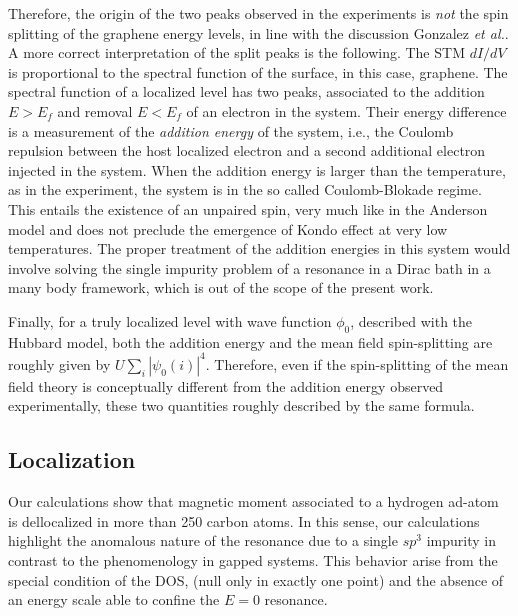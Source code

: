 \documentclass[aps,prb,twocolumn,superscriptaddress]{revtex4-1}
\begin{document}
Therefore, the origin of the two peaks observed in the experiments
\cite{gonzalez2016atomic} is {\em not} the spin splitting of the graphene energy levels, in line with the discussion Gonzalez {\em et al.}\cite{gonzalez2016atomic}.  A more correct interpretation of the split peaks is the following. The STM $dI/dV$ is proportional to the spectral function of the surface, in this case,  graphene. The spectral function of a localized level has two peaks,  associated to the addition $E>E_f$ and removal $E<E_f$ of an electron in the system. Their energy difference is a measurement of the {\em addition energy} of the system, i.e., the Coulomb repulsion between the host localized electron and a second additional electron injected in the system. When the addition energy is larger than the temperature, as in the experiment, the system is in the so called Coulomb-Blokade regime. This entails the existence of an unpaired spin, very much like in the Anderson model\cite{anderson1961localized} and does not preclude the emergence of Kondo effect at very low temperatures. The proper treatment of the addition energies in this system would involve solving the single impurity problem of a resonance in a Dirac bath in a many body  framework\cite{haase2011magnetic,sofo2012magnetic,mitchell13}, which is out of the scope of the present work.

Finally, for a truly localized level with wave function $\phi_0$, described with the Hubbard model,  both the addition energy and the mean field spin-splitting are roughly given by  $U\sum_i |\psi_0(i)|^4$.  Therefore,  even if the spin-splitting  of the mean field theory is conceptually different from the addition energy observed experimentally, these two quantities roughly described by the same formula.



\subsection{Localization}
Our calculations show that magnetic moment associated to a hydrogen ad-atom is dellocalized in more than 250 carbon atoms.
In this sense, our calculations highlight the anomalous nature of the resonance due to a single $sp^3$ impurity in contrast to the phenomenology in gapped systems. This behavior arise from the special condition of the DOS, (null only in exactly one point) and the absence of an energy scale able to confine the $E=0$ resonance.
\end{document}
